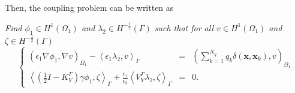 Then, the coupling problem can be written as
%
\begin{center}
  \textit{Find $ \phi_1 \in H^1(\Omega_1)$ and $\lambda_2 \in H^{-\frac{1}{2}}(\Gamma)$ such that for all $v \in H^1(\Omega_1)$ and $\zeta \in H^{-\frac{1}{2}}(\Gamma)$}
\begin{equation} 
\label{eq:standard_fem_bem}
 \left\{
 \begin{array}{rcl}
 \left(  \epsilon_1 \nabla \phi_1, \nabla v \right)_{\Omega_1}  - \left< \epsilon_1 \lambda_2, v \right>_\Gamma &=&   \left(  \sum_{k=1}^{N_q} q_k\delta(\mathbf{x},\mathbf{x}_k),  v \right)_{\Omega_1} \\[3mm] 
  \left< \left(\tfrac{1}{2} I - K_{Y}^{\Gamma}\right) \gamma \phi_1, \zeta \right>_\Gamma + \tfrac{\epsilon_1}{\epsilon_2} \left< V_{Y}^{\Gamma} \lambda_2, \zeta \right>_\Gamma &=&0.
  \end{array}
  \right.
\end{equation}
\end{center}



